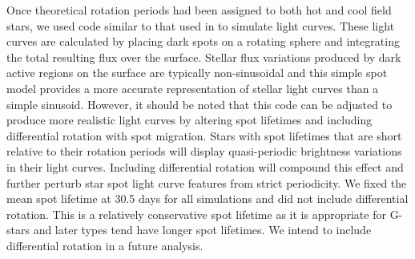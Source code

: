 Once theoretical rotation periods had been assigned to both hot and cool field
stars, we used code similar to that used in \citet{Aigrain2015b} to simulate
light curves.
These light curves are calculated by placing dark spots on a rotating sphere
and integrating the total resulting flux over the surface.
Stellar flux variations produced by dark active regions on the surface are
typically non-sinusoidal and this simple spot model provides a more accurate
representation of stellar light curves than a simple sinusoid.
However, it should be noted that this code can be adjusted to produce more
realistic light curves by altering spot lifetimes and including differential
rotation with spot migration.
Stars with spot lifetimes that are short relative to their rotation periods
will display quasi-periodic brightness variations in their light curves.
Including differential rotation will compound this effect and further perturb
star spot light curve features from strict periodicity.
We fixed the mean spot lifetime at 30.5 days for all simulations and did not
include differential rotation.
This is a relatively conservative spot lifetime as it is appropriate for
G-stars and later types tend have longer spot lifetimes.
We intend to include differential rotation in a future analysis.

